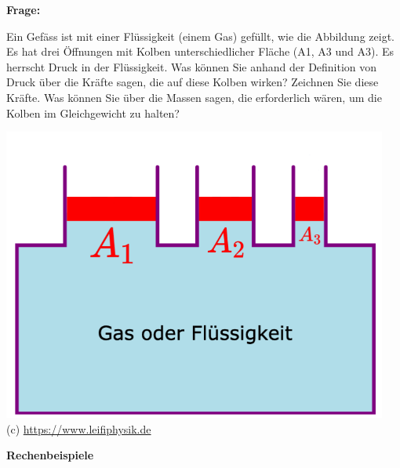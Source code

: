 \documentclass[11pt]{article}
\begin{document}
\begin{minipage}{0.55\textwidth}
    \textbf{Frage:} \vspace{0.2cm}
    
    Ein Gefäss ist mit einer Flüssigkeit (einem Gas) gefüllt, wie die Abbildung zeigt. Es hat drei Öffnungen mit Kolben unterschiedlicher Fläche (A1, A3 und A3). Es herrscht Druck in der Flüssigkeit. Was können Sie anhand der Definition von Druck über die Kräfte sagen, die auf diese Kolben wirken?  Zeichnen Sie diese Kräfte. Was können Sie über die Massen sagen, die erforderlich wären, um die Kolben im Gleichgewicht zu halten?
\end{minipage}
\begin{minipage}{0.43\textwidth}
\vspace{1cm}
    \begin{flushright}
        \includegraphics[width=0.95\textwidth]{images/Druck_02_Aufgabe.png}\\
        {\scriptsize (c) \url{https://www.leifiphysik.de}}
    \end{flushright}
\end{minipage}
    
\newpage


\textbf{Rechenbeispiele}
\end{document}
